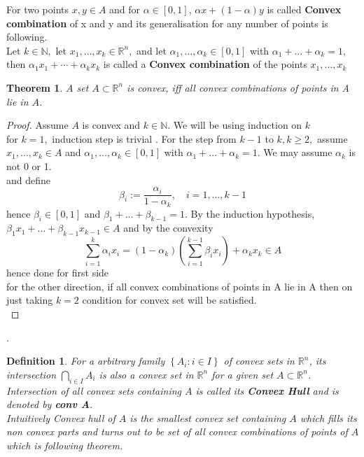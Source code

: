 \documentclass[oneside]{book}
\newtheorem{theorem}{Theorem}[section]
\newtheorem{mydef}{Definition}
\begin{document}
 For two points $x,y \in A$ and for $\alpha \in [0,1]$, $\alpha x +(1- \alpha)y  $ is called \textbf{Convex combination} of x and y and its generalisation for any number of  points is following. \\

Let $k \in \mathbb{N},$ let $x_{1}, \ldots, x_{k} \in \mathbb{R}^{n},$ and let $\alpha_{1}, \ldots, \alpha_{k} \in[0,1]$ with $\alpha_{1}+\ldots+\alpha_{k}=1,$ then
$\alpha_{1} x_{1}+\cdots+\alpha_{k} x_{k}$ is called a \textbf{Convex combination} of the points $x_{1}, \ldots, x_{k}$

\begin{theorem}
\label{t:4}
$A$ set $A \subset \mathbb{R}^{n}$ is convex, iff  all convex combinations of points in A lie
in $A$.
\end{theorem}

\begin{proof}

 Assume $A$ is convex and $k \in \mathbb{N} .$ We will be using induction on $k$ \\ for $k=1,$ induction step is trivial  . For the step from $k-1$ to $k, k \geq 2,$ assume $x_{1}, \ldots, x_{k} \in A$ and $\alpha_{1}, \ldots, \alpha_{k} \in[0,1]$ with $\alpha_{1}+\ldots+\alpha_{k}=1 .$ We may assume $\alpha_{k}$ is not 0 or 1.\\ and define 
$$
\beta_{i}:=\frac{\alpha_{i}}{1-\alpha_{k}}, \quad i=1, \ldots, k-1
$$
hence $\beta_{i} \in[0,1]$ and $\beta_{1}+\ldots+\beta_{k-1}=1 .$ By the induction hypothesis, $\beta_{1} x_{1}+\ldots+\beta_{k-1} x_{k-1} \in A$
and by the convexity
$$
\sum_{i=1}^{k} \alpha_{i} x_{i}=\left(1-\alpha_{k}\right)\left(\sum_{i=1}^{k-1} \beta_{i} x_{i}\right)+\alpha_{k} x_{k} \in A
$$
hence done for first side\\
for the other direction, if all convex combinations of points in A lie in A then on just taking $k =2$ condition for convex set will be satisfied.\\

\end{proof}.

\begin{mydef} 


For a arbitrary family  $\left\{A_{i}: i \in I\right\}$ of convex sets in   $\mathbb{R}^{n}$, its intersection $\bigcap_{i \in I} A_{i}$ is also a convex set in $\mathbb{R}^{n}$  for a given set $A \subset \mathbb{R}^{n}$.\\ Intersection of all convex sets containing $A$ is called its  \textbf{Convex Hull} and is denoted by  \textbf{conv A}.\\
 Intuitively Convex hull of $A$  is the smallest convex set containing $A$ which fills its non convex parts and turns out to be set of all convex combinations of points of $A$ which is following theorem.
 
 \end{mydef}
 
\end{document}
